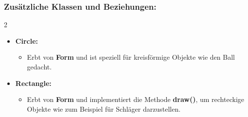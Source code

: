 \documentclass[a4paper,12pt]{article}
\begin{document}
\subsubsection{Zusätzliche Klassen und Beziehungen:}
\vspace{-0.5\baselineskip}
\begin{multicols}{2}
\begin{itemize}[label={},leftmargin=*,noitemsep,topsep=0pt,parsep=0pt]
    \item \textbf{Circle:}
    \begin{itemize}[label={},leftmargin=*,noitemsep,topsep=0pt,parsep=0pt]
        \item Erbt von \textbf{Form} und ist speziell für kreisförmige Objekte wie den Ball gedacht.
    \end{itemize}
\end{itemize}
\columnbreak
\begin{itemize}[label={},leftmargin=*,noitemsep,topsep=0pt,parsep=0pt]
    \item \textbf{Rectangle:}
    \begin{itemize}[label={},leftmargin=*,noitemsep,topsep=0pt,parsep=0pt]
        \item Erbt von \textbf{Form} und implementiert die Methode \textbf{draw()}, um rechteckige Objekte wie zum Beispiel für Schläger darzustellen.
    \end{itemize}
\end{itemize}
\end{multicols}
\clearpage
\end{document}
